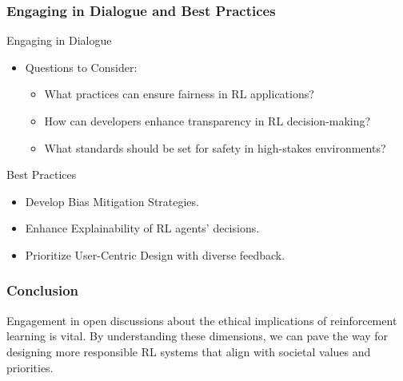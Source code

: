 \documentclass[aspectratio=169]{beamer}
\begin{document}
\begin{frame}[fragile]
    \frametitle{Engaging in Dialogue and Best Practices}
    \begin{block}{Engaging in Dialogue}
        \begin{itemize}
            \item Questions to Consider:
            \begin{itemize}
                \item What practices can ensure fairness in RL applications?
                \item How can developers enhance transparency in RL decision-making?
                \item What standards should be set for safety in high-stakes environments?
            \end{itemize}
        \end{itemize}
    \end{block}

    \begin{block}{Best Practices}
        \begin{itemize}
            \item Develop Bias Mitigation Strategies.
            \item Enhance Explainability of RL agents' decisions.
            \item Prioritize User-Centric Design with diverse feedback.
        \end{itemize}
    \end{block}
\end{frame}

\begin{frame}[fragile]
    \frametitle{Conclusion}
    Engagement in open discussions about the ethical implications of reinforcement learning is vital. By understanding these dimensions, we can pave the way for designing more responsible RL systems that align with societal values and priorities.
\end{frame}
\end{document}
